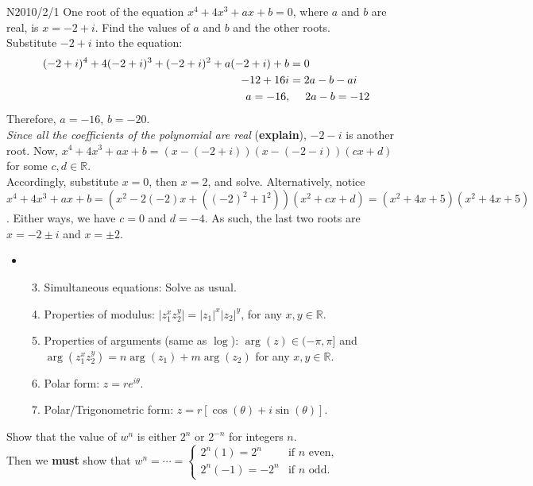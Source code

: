 \documentclass[oneside]{book}
\begin{document}
        \begin{example}{N2010/2/1}{}
          One root of the equation \(x^4+4x^3+ax+b=0\), where \(a\) and \(b\) are real, is \(x=-2+i\). Find the values of \(a\) and \(b\) and the other roots.\\[3mm]
          Substitute \(-2+i\) into the equation:
          \begin{align*}
            (-2+i)^4+4(-2+i)^3+(-2+i)^2+a(-2+i)+b&=0\\
            -12+16i&=2a-b-ai\\
            a=-16, &\hphantom{=}\ \ 2a-b=-12
          \end{align*}
          Therefore, \(a=-16\), \(b=-20\).\\[3mm]
          \emph{Since all the coefficients of the polynomial are real} (\textbf{explain}), \(-2-i\) is another root. Now, \(x^4+4x^3+ax+b=(x-(-2+i))(x-(-2-i))(cx+d)\) for some \(c,d \in \mathbb{R}\).\\[3mm]
          Accordingly, substitute \(x=0\), then \(x=2\), and solve. Alternatively, notice \(x^4+4x^3+ax+b=(x^2-2(-2)x+((-2)^2+1^2))(x^2+cx+d)=(x^2+4x+5)(x^2+4x+5)\). Either ways, we have \(c=0\) and \(d=-4\). As such, the last two roots are \(x=-2 \pm i\) and \(x=\pm 2\). 
        \end{example}
      \begin{stbox}{}
        \begin{itemize}[label=\hphantom{1.}]
          \item
          \begin{enumerate}[label=(\alph*)]
            \setcounter{enumi}{2}
            \item Simultaneous equations: Solve as usual.
            \item Properties of modulus: \(\lvert z_1^xz_2^y \rvert=\lvert z_1 \rvert^x \lvert z_2 \rvert^y\), for any \(x,y \in \mathbb{R}\).
            \item Properties of arguments (same as \(\log\)): \(\arg(z) \in (-\pi,\pi]\) and \(\arg(z_1^xz_2^y)=n\arg(z_1)+m\arg(z_2)\) for any \(x,y \in \mathbb{R}\).
            \item Polar form: \(z=re^{i\theta}\).
            \item Polar/Trigonometric form: \(z=r[\cos(\theta)+i\sin(\theta)]\).
          \end{enumerate}
        \end{itemize}
  \end{stbox}
  \begin{note}
    Show that the value of \(w^n\) is either \(2^n\) or \(2^{-n}\) for integers \(n\).\\[3mm]
    Then we \textbf{must} show that \(w^n=\cdots=\begin{cases}
      2^n(1)=2^n&\text{if }n\text{ even},\\
      2^n(-1)=-2^n&\text{if }n\text{ odd}.
    \end{cases}\) 
  \end{note}
\end{document}
